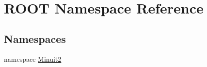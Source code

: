 \hypertarget{namespaceROOT}{
\section{ROOT Namespace Reference}
\label{namespaceROOT}
}
\subsection*{Namespaces}
\begin{DoxyCompactItemize}
\item 
namespace \hyperlink{namespaceROOT_1_1Minuit2}{Minuit2}
\end{DoxyCompactItemize}
